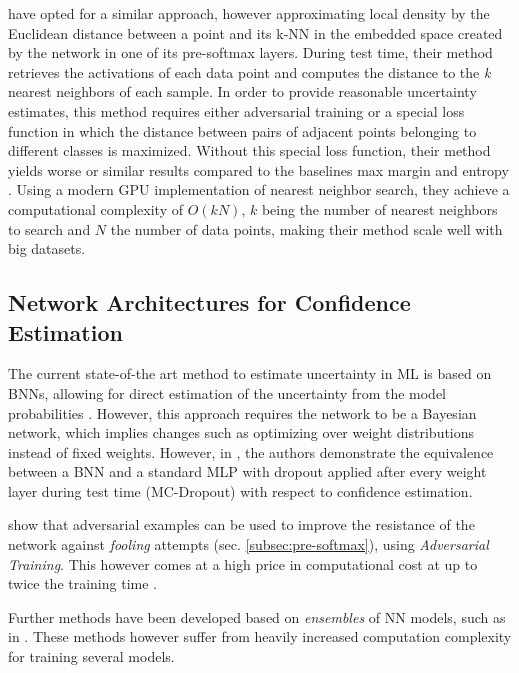 \documentclass[10pt]{article}
\begin{document}
\textcite{mandelbaum17} have opted for a similar approach, however approximating local density by the Euclidean distance between a point and its \gls{k-NN} in the embedded space created by the network in one of its pre-softmax layers. During test time, their method retrieves the activations of each data point and computes the distance to the \textit{k} nearest neighbors of each sample. In order to provide reasonable uncertainty estimates, this method requires either adversarial training or a special loss function in which the distance between pairs of adjacent points belonging to different classes is maximized. Without this special loss function, their method yields worse or similar results compared to the baselines max margin and entropy \cite{mandelbaum17}. Using a modern \acrshort{GPU} implementation of nearest neighbor search, they achieve a computational complexity of $O(kN)$, $k$ being the number of nearest neighbors to search and $N$ the number of data points, making their method scale well with big datasets.

\subsection{Network Architectures for Confidence Estimation}
The current state-of-the art method to estimate uncertainty in \gls{ML} is based on \glspl{BNN}, allowing for direct estimation of the uncertainty from the model probabilities \cite{Gal2015Dropout,ghahramani,KendallG17}. However, this approach requires the network to be a Bayesian network, which implies changes such as optimizing over weight distributions instead of fixed weights. However, in \textcite{Gal2015Dropout, ghahramani}, the authors demonstrate the equivalence between a \gls{BNN} and a standard \gls{MLP} with dropout applied after every weight layer during test time (\gls{MC-Dropout}) with respect to confidence estimation.

\textcite{Goodfellow2014} show that adversarial examples can be used to improve the resistance of the network against \textit{fooling} attempts (sec. \ref{subsec:pre-softmax}), using \textit{Adversarial Training}. This however comes at a high price in computational cost at up to twice the training time \cite{mandelbaum17}.

Further methods have been developed based on \textit{ensembles} of NN models, such as in \textcite{Lakshminarayanan16, mandelbaum17}. These methods however suffer from heavily increased computation complexity for training several models.
\end{document}
